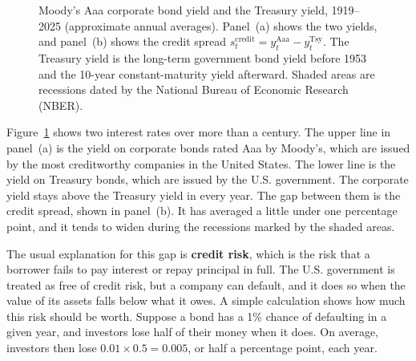 \begin{figure}[htbp]
\caption{Moody's Aaa corporate bond yield and the Treasury yield, 1919--2025 (approximate annual averages). Panel~(a) shows the two yields, and panel~(b) shows the credit spread $s_t^{\text{credit}} = y_t^{\text{Aaa}} - y_t^{\text{Tsy}}$. The Treasury yield is the long-term government bond yield before 1953 and the 10-year constant-maturity yield afterward. Shaded areas are recessions dated by the National Bureau of Economic Research (NBER).}
\label{fig:aaa-treasury-spread}
\end{figure}

Figure~\ref{fig:aaa-treasury-spread} shows two interest rates over more than a century. The upper line in panel~(a) is the yield on corporate bonds rated Aaa by Moody's, which are issued by the most creditworthy companies in the United States. The lower line is the yield on Treasury bonds, which are issued by the U.S. government. The corporate yield stays above the Treasury yield in every year. The gap between them is the credit spread, shown in panel~(b). It has averaged a little under one percentage point, and it tends to widen during the recessions marked by the shaded areas.

The usual explanation for this gap is \textbf{credit risk}, which is the risk that a borrower fails to pay interest or repay principal in full. The U.S. government is treated as free of credit risk, but a company can default, and it does so when the value of its assets falls below what it owes. A simple calculation shows how much this risk should be worth. Suppose a bond has a 1\% 
chance of defaulting in a given year, and investors lose half of their money when it does. On average, investors then lose $0.01 \times 0.5 = 0.005$, or half a percentage point, each year. 

